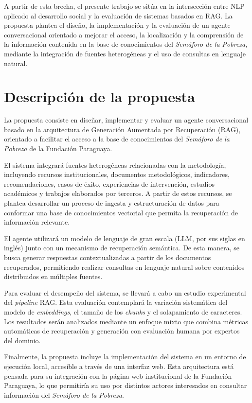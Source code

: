 \documentclass{article}
\begin{document}
A partir de esta brecha, el presente trabajo se sitúa en la intersección entre NLP aplicado al desarrollo social y la evaluación de sistemas basados en RAG. La propuesta plantea el diseño, la implementación y la evaluación de un agente conversacional orientado a mejorar el acceso, la localización y la comprensión de la información contenida en la base de conocimientos del \textit{Semáforo de la Pobreza}, mediante la integración de fuentes heterogéneas y el uso de consultas en lenguaje natural.
\section{Descripción de la propuesta}\label{sec:descripcion}

La propuesta consiste en diseñar, implementar y evaluar un agente conversacional basado en la arquitectura de Generación Aumentada por Recuperación (RAG), orientado a facilitar el acceso a la base de conocimientos del \textit{Semáforo de la Pobreza} de la Fundación Paraguaya.

El sistema integrará fuentes heterogéneas relacionadas con la metodología, incluyendo recursos institucionales, documentos metodológicos, indicadores, recomendaciones, casos de éxito, experiencias de intervención, estudios académicos y trabajos elaborados por terceros. A partir de estos recursos, se plantea desarrollar un proceso de ingesta y estructuración de datos para conformar una base de conocimientos vectorial que permita la recuperación de información relevante.

El agente utilizará un modelo de lenguaje de gran escala (LLM, por sus siglas en inglés) junto con un mecanismo de recuperación semántica. De esta manera, se busca generar respuestas contextualizadas a partir de los documentos recuperados, permitiendo realizar consultas en lenguaje natural sobre contenidos distribuidos en múltiples fuentes.

Para evaluar el desempeño del sistema, se llevará a cabo un estudio experimental del \textit{pipeline} RAG. Esta evaluación contemplará la variación sistemática del modelo de \textit{embeddings}, el tamaño de los \textit{chunks} y el solapamiento de caracteres. Los resultados serán analizados mediante un enfoque mixto que combina métricas automáticas de recuperación y generación con evaluación humana por expertos del dominio.

Finalmente, la propuesta incluye la implementación del sistema en un entorno de ejecución local, accesible a través de una interfaz web. Esta arquitectura está pensada para su integración con la página web institucional de la Fundación Paraguaya, lo que permitiría su uso por distintos actores interesados en consultar información del \textit{Semáforo de la Pobreza}.
\end{document}
